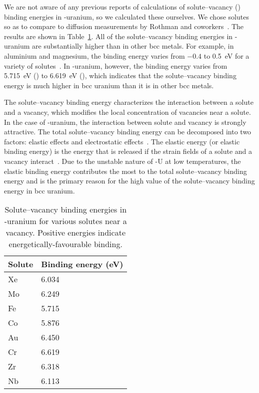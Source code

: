 We are not aware of any previous reports of calculations of solute--vacancy
() binding energies in \mbox{\textgamma-uranium},
so we calculated these ourselves.
We chose solutes so as to compare to diffusion measurements by Rothman and
coworkers~\cite{rothman1961diffusion, rothman1959self, peterson1964diffusion}.
The results are shown in Table~\ref{tab_solvac}.
All of the solute--vacancy binding energies in \mbox{\textgamma-uranium} are
substantially higher than in other bcc metals.
For example, in aluminium and magnesium,
the  binding energy varies from $-0.4$ to 0.5~eV for a variety
of solutes~\cite{wolverton2007solute, shin2010first,saal2012solute}.
In \mbox{\textgamma-uranium}, however, the binding energy varies from 5.715~eV
(\mbox{}) to 6.619~eV (),
which indicates that the solute--vacancy binding energy is much higher in bcc
uranium than it is in other bcc metals.

The solute--vacancy binding energy characterizes the interaction between a
solute and a vacancy, which modifies the local concentration of vacancies near
a solute. In the case of \mbox{\textgamma-uranium}, the interaction between
solute and vacancy is strongly attractive.
The total solute--vacancy binding energy can be decomposed into two factors: 
elastic effects and electrostatic effects~\cite{burke1972measurement}.
The elastic energy (or elastic binding energy) is the energy that is released
if the strain fields of a solute and a vacancy
interact~\cite{kong2014first, ohnuma2009first}.
Due to the unstable nature of \mbox{\textgamma-U} at low temperatures,
the elastic binding energy contributes the most to the total solute--vacancy
binding energy and is the primary reason for the high value of the
solute--vacancy binding energy in bcc uranium. 


\begin{table}
    \centering
    \caption{Solute--vacancy binding energies in \textgamma-uranium for
        various solutes near a vacancy.
        Positive energies indicate energetically-favourable binding.}
    \label{tab_solvac}
    \begin{tabular}{l l}
      \toprule
        Solute & Binding energy (eV) \\
      \midrule
        Xe & 6.034 \\
        Mo & 6.249 \\
        Fe & 5.715 \\
        Co & 5.876 \\
        Au & 6.450 \\
        Cr & 6.619 \\
        Zr & 6.318 \\
        Nb & 6.113 \\
      \bottomrule
    \end{tabular}
\end{table}

